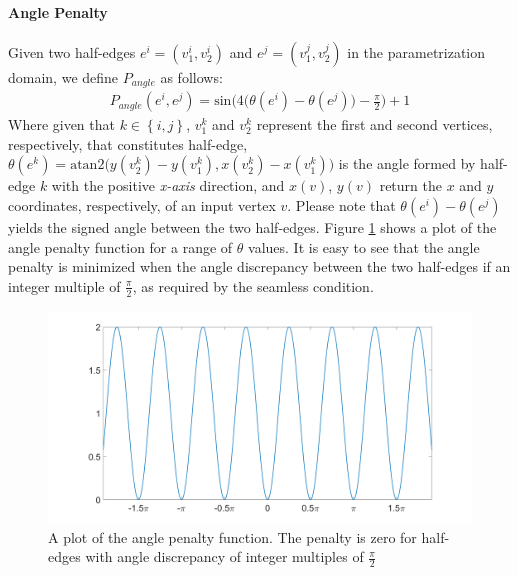 \paragraph{Angle Penalty}
Given two half-edges $e^i = \left(v^i_1,v^i_2\right)$ and $e^j = \left(v^j_1,v^j_2\right)$ in the parametrization domain, we define $P_{angle}$ as follows:
\begin{equation}\label{angle_penalty}
\begin{split}
P_{angle}\left(e^i,e^j\right) = \mathrm{sin} \bigg( 4\Big(\theta\left(e^i\right) - \theta\left(e^j\right)\Big) - \frac{\pi}{2}\bigg) + 1
\end{split}
\end{equation}
Where given that $k\in\left\{i,j\right\}$, $v^k_1$ and $v^k_2$ represent the first and second vertices, respectively, that constitutes half-edge, $\theta\left(e^k\right) = \mathrm{atan2}\Big(y\left(v^k_2\right) - y\left(v^k_1\right), x\left(v^k_2\right) - x\left(v^k_1\right)\Big)$ is the angle formed by half-edge $k$ with the positive \emph{x-axis} direction, and $x\left(v\right)$, $y\left(v\right)$ return the $x$ and $y$ coordinates, respectively, of an input vertex $v$. Please note that $\theta\left(e^i\right) - \theta\left(e^j\right)$ yields the signed angle between the two half-edges. Figure \ref{fig:angle_penalty} shows a plot of the angle penalty function for a range of $\theta$ values. It is easy to see that the angle penalty is minimized when the angle discrepancy between the two half-edges if an integer multiple of $\frac{\pi}{2}$, as required by the seamless condition.
\begin{figure}[ht]
\centering
\includegraphics[width=15cm]{figures/seamless/angle_penalty.png}
\caption[Angle Penalty Function]{A plot of the angle penalty function. The penalty is zero for half-edges with angle discrepancy of integer multiples of $\frac{\pi}{2}$}
\label{fig:angle_penalty}
\end{figure}
